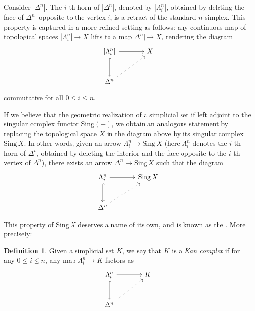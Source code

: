 \documentclass[a4paper,11pt]{article}
\theoremstyle{plain}
\theoremstyle{definition}
\newtheorem{defi}[thm]{Definition}
\theoremstyle{remark}
\begin{document}
Consider $|\Delta^n|$. The $i$-th horn of $|\Delta^n|$, denoted by $|\Lambda_i^n|$, obtained by deleting the face of $\Delta^n|$ opposite to the vertex $i$, is a retract of the standard $n$-simplex. This property is captured in a more refined setting as follows: any continuous map of topological spaces $|\Lambda_i^n| \to X$ lifts to a map $\Delta^n| \to X$, rendering the diagram 
\begin{equation*}
    \begin{tikzcd}[row sep = large, column sep = large]
    \left| \Lambda_i^n\right| \arrow[d, hook] \arrow[r] & X \\
    \left|\Delta^n\right| \arrow[ru, dotted] & 
    \end{tikzcd}
\end{equation*}
commutative for all $0 \leq i \leq n$. 

If we believe that the geometric realization of a simplicial set if left adjoint to the singular complex functor $\text{Sing}(-)$, we obtain an analogous statement by replacing the topological space $X$ in the diagram above by its singular complex $\text{Sing}\, X$. In other words, given an arrow $\Lambda_i^n \to \text{Sing}\, X$ (here $\Lambda_i^n$ denotes the $i$-th horn of $\Delta^n$, obtained by deleting the interior and the face opposite to the $i$-th vertex of $\Delta^n$), there exists an arrow $\Delta^n \to \text{Sing}\, X$ such that the diagram
\begin{equation*}
    \begin{tikzcd}[row sep = large, column sep = large]
    \Lambda_i^n \arrow[d, hook] \arrow[r] & \text{Sing}\, X \\
    \Delta^n \arrow[ru, dotted] & 
    \end{tikzcd}
\end{equation*}

This property of $\text{Sing}\, X$ deserves a name of its own, and is known as the . More precisely:

\begin{defi}
Given a simplicial set $K$, we say that $K$ is a \textit{Kan complex} if for any $0 \le i \leq n$, any map $\Lambda_i^n \to K$ factors as 
\begin{equation*}
    \begin{tikzcd}[row sep = large, column sep = large]
    \Lambda_i^n \arrow[d, hook] \arrow[r] & K\\
    \Delta^n \arrow[ru, dotted] & 
    \end{tikzcd}
\end{equation*}
\end{defi}
\end{document}
